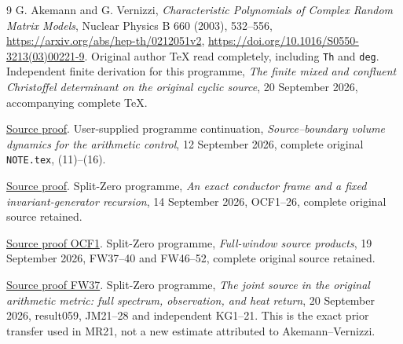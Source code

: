 \documentclass[11pt]{article}
\begin{document}
\begin{thebibliography}{9}
 G. Akemann and G. Vernizzi,
\emph{Characteristic Polynomials of Complex Random Matrix Models},
Nuclear Physics B 660 (2003), 532--556,
\url{https://arxiv.org/abs/hep-th/0212051v2},
\url{https://doi.org/10.1016/S0550-3213(03)00221-9}.
Original author TeX read completely, including \texttt{Th} and \texttt{deg}.
 Independent finite derivation for this programme,
\emph{The finite mixed and confluent Christoffel determinant on the
original cyclic source}, 20 September 2026, accompanying complete TeX.

\href{https://github.com/KokunoYumeto/zeta-function-research-reader/blob/5992ad50c0f2a06921f1fcaded7b4e38097c0739/workbenches/splitzero-tandem/continuations/20260920-original-kernel-mixed-determinants/MIXED_CONFLUENT_PROOF.tex\#L1}{Source proof}.
 User-supplied programme continuation,
\emph{Source--boundary volume dynamics for the arithmetic control},
12 September 2026, complete original \texttt{NOTE.tex}, (11)--(16).

\href{https://github.com/KokunoYumeto/zeta-function-research-reader/blob/5992ad50c0f2a06921f1fcaded7b4e38097c0739/workbenches/splitzero-tandem/continuations/20260920-original-kernel-mixed-determinants/providers/TODA_VOLUME_CONTROL.tex\#L1}{Source proof}.
 Split-Zero programme,
\emph{An exact conductor frame and a fixed invariant-generator recursion},
14 September 2026, OCF1--26, complete original source retained.

\href{https://github.com/KokunoYumeto/zeta-function-research-reader/blob/5992ad50c0f2a06921f1fcaded7b4e38097c0739/workbenches/splitzero-tandem/continuations/20260920-original-kernel-mixed-determinants/providers/ORIGINAL_CONDUCTOR_STRIP_FRAME.tex\#L27}{Source proof OCF1}.
 Split-Zero programme,
\emph{Full-window source products}, 19 September 2026,
FW37--40 and FW46--52, complete original source retained.

\href{https://github.com/KokunoYumeto/zeta-function-research-reader/blob/5992ad50c0f2a06921f1fcaded7b4e38097c0739/workbenches/splitzero-tandem/continuations/20260920-original-kernel-mixed-determinants/providers/FULL_WINDOW_SOURCE_PRODUCTS.tex\#L577}{Source proof FW37}.
 Split-Zero programme,
\emph{The joint source in the original arithmetic metric: full spectrum,
observation, and heat return}, 20 September 2026, result059,
JM21--28 and independent KG1--21. This is the exact prior transfer
used in MR21, not a new estimate attributed to Akemann--Vernizzi.


\end{thebibliography}
\end{document}
